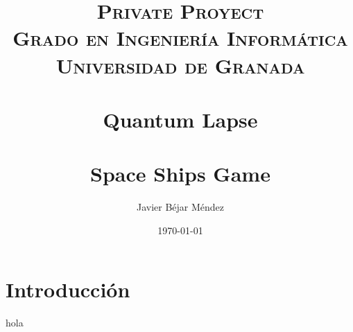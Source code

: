 


\title{	
\normalfont \normalsize 
\textsc{{\bf Private Proyect} \\ Grado en Ingeniería Informática \\ Universidad de Granada} \\ [25pt] %
\horrule{0.5pt} \\[0.4cm] %
\huge Quantum Lapse \\ %
\horrule{2pt} \\[0.5cm] %
Space Ships Game
\horrule{2pt} \\
}

\author{Javier Béjar Méndez} %

\date{\normalsize\today} %




\maketitle %

\newpage %

\tableofcontents %

\listoffigures

\listoftables

\newpage

\section{Introducción}
hola\cite{gitrepo}

